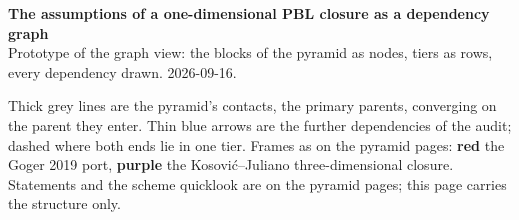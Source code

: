 \documentclass[10pt]{article}
\begin{document}
{\Large\bfseries The assumptions of a one-dimensional PBL closure as a dependency graph}\\[0.3ex]
{\small Prototype of the graph view: the blocks of the pyramid as nodes, tiers as rows, every dependency drawn. 2026-09-16.}

\vspace{0.4ex}
{\footnotesize Thick grey lines are the pyramid's contacts, the primary parents, converging on the parent they enter.
Thin blue arrows are the further dependencies of the audit; dashed where both ends lie in one tier. Frames as on the
pyramid pages: \textcolor{cGXIX}{\textbf{red}} the Goger 2019 port, \textcolor{cFULL}{\textbf{purple}} the
Kosovi\'c--Juliano three-dimensional closure. Statements and the scheme quicklook are on the pyramid pages; this page
carries the structure only.\par}
\vspace{1ex}
\end{document}
